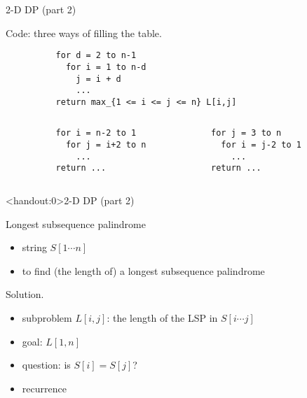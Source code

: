 \begin{frame}[fragile]{2-D DP (part 2)}
  \begin{block}{Code: three ways of filling the table.}
    \begin{center}
        \begin{verbatim}
          for d = 2 to n-1
            for i = 1 to n-d
              j = i + d
              ...
          return max_{1 <= i <= j <= n} L[i,j]
       \end{verbatim}
    \end{center}

    \begin{columns}[t]
        \begin{verbatim}
          for i = n-2 to 1
            for j = i+2 to n
              ...
          return ...
        \end{verbatim}
        \begin{verbatim}
          for j = 3 to n
            for i = j-2 to 1
              ...
          return ...
       \end{verbatim}
    \end{columns}
  \end{block}
\end{frame}
\begin{frame}<handout:0>{2-D DP (part 2)}
  \begin{exampleblock}{Longest subsequence palindrome }
    \begin{itemize}
      \item string $S[1 \cdots n]$
      \item to find (the length of) a longest subsequence palindrome
    \end{itemize}
  \end{exampleblock}

  \begin{block}{Solution.}
    \begin{itemize}
      \item subproblem $L[i,j]$: the length of the LSP in $S[i \cdots j]$
      \item goal: $L[1,n]$
      \item question: is $S[i] = S[j]$?
      \item recurrence
    \end{itemize}
  \end{block}
\end{frame}
